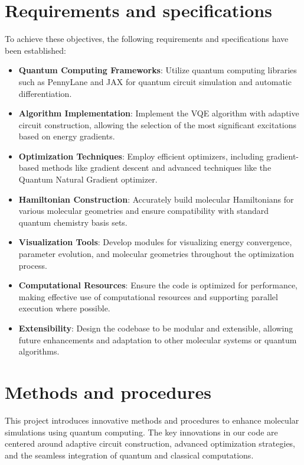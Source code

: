\section{Requirements and specifications}

To achieve these objectives, the following requirements and specifications have been established:

\begin{itemize} \item \textbf{Quantum Computing Frameworks}: Utilize quantum computing libraries such as PennyLane and JAX for quantum circuit simulation and automatic differentiation. \item \textbf{Algorithm Implementation}: Implement the VQE algorithm with adaptive circuit construction, allowing the selection of the most significant excitations based on energy gradients. \item \textbf{Optimization Techniques}: Employ efficient optimizers, including gradient-based methods like gradient descent and advanced techniques like the Quantum Natural Gradient optimizer. \item \textbf{Hamiltonian Construction}: Accurately build molecular Hamiltonians for various molecular geometries and ensure compatibility with standard quantum chemistry basis sets. \item \textbf{Visualization Tools}: Develop modules for visualizing energy convergence, parameter evolution, and molecular geometries throughout the optimization process. \item \textbf{Computational Resources}: Ensure the code is optimized for performance, making effective use of computational resources and supporting parallel execution where possible. \item \textbf{Extensibility}: Design the codebase to be modular and extensible, allowing future enhancements and adaptation to other molecular systems or quantum algorithms. \end{itemize}

\section{Methods and procedures}

This project introduces innovative methods and procedures to enhance molecular simulations using quantum computing. The key innovations in our code are centered around adaptive circuit construction, advanced optimization strategies, and the seamless integration of quantum and classical computations.


